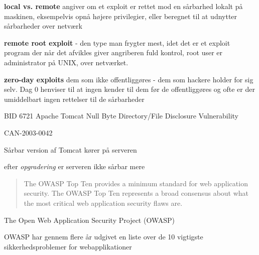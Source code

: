 \documentclass[20pt,landscape,a4paper,footrule]{foils}
\begin{document}
\begin{list1}
\item {\bfseries local vs. remote}
angiver om et exploit er rettet mod
en sårbarhed lokalt på maskinen, eksempelvis
opnå højere privilegier, eller beregnet
til at udnytter sårbarheder over netværk
\item {\bfseries remote root exploit}
- den type man frygter mest, idet
det er et exploit program der når det afvikles giver
angriberen fuld kontrol, root user er administrator
på UNIX, over netværket.
\item {\bfseries zero-day exploits} dem som ikke offentliggøres - dem
  som hackere holder for sig selv. Dag 0 henviser til at ingen kender
  til dem før de offentliggøres og ofte er der umiddelbart ingen
  rettelser til de sårbarheder
\end{list1}




\begin{list1}
\item BID 6721 Apache Tomcat Null Byte Directory/File Disclosure Vulnerability
\item {}
\item CAN-2003-0042
\end{list1}




\centerline{Sårbar version af Tomcat kører på serveren}



\centerline{efter \emph{opgradering} er serveren ikke sårbar mere}



\begin{quote}
The OWASP Top Ten provides a minimum standard for web application
security. The OWASP Top Ten represents a broad consensus about what
the most critical web application security flaws are.
\end{quote}

\begin{list1}
\item The Open Web Application Security Project (OWASP)
\item OWASP har gennem flere år udgivet en liste over de 10 vigtigste
  sikkerhedsproblemer for webapplikationer
\item {}
\end{list1}
\end{document}
